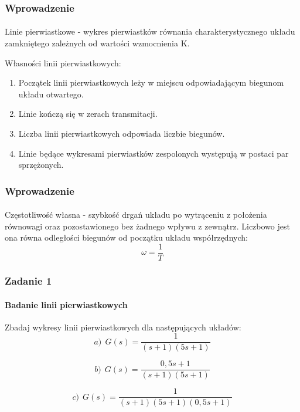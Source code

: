 \documentclass{beamer}
\begin{document}
\begin{frame}\frametitle{Wprowadzenie}\framesubtitle{}
	Linie pierwiastkowe - wykres pierwiastków równania charakterystycznego układu zamkniętego zależnych od wartości wzmocnienia K.
	
	Własności linii pierwiastkowych:
	\begin{enumerate}
		\item Początek linii pierwiastkowych leży w miejscu odpowiadającym biegunom układu otwartego.
		
		\item Linie kończą się w zerach transmitacji.
		
		\item Liczba linii pierwiastkowych odpowiada liczbie biegunów.
		
		\item Linie będące wykresami pierwiastków zespolonych występują w postaci par sprzężonych.
	\end{enumerate}
\end{frame}

\begin{frame}\frametitle{Wprowadzenie}\framesubtitle{}
	Częstotliwość własna - szybkość drgań układu po wytrąceniu z położenia równowagi oraz pozostawionego bez żadnego wpływu z zewnątrz. Liczbowo jest ona równa odległości biegunów od początku układu współrzędnych:
	\[
		\omega = \frac{1}{T}
	\]
\end{frame}


\begin{frame}\frametitle{Zadanie 1}\framesubtitle{Badanie linii pierwiastkowych}
Zbadaj wykresy linii pierwiastkowych dla następujących układów:
\[
a) ~~ G(s) = \frac{1}{(s+1)(5s+1)}
\]

\[
b) ~~ G(s) = \frac{0,5s + 1}{(s+1)(5s+1)}
\]

\[
c) ~~ G(s) = \frac{1}{(s+1)(5s+1)(0,5s + 1)}
\]
\end{frame}

\end{document}
